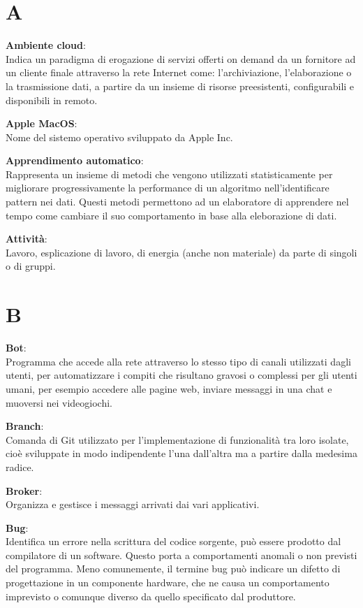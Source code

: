\documentclass[a4paper, oneside, openany, dvipsnames, table]{article}
\begin{document}
\copertina{}


\newpage
\tableofcontents
\newpage


\newpage
\section{A}  
\textbf{Ambiente cloud}:\\	 Indica un paradigma di erogazione di servizi offerti on demand da un fornitore ad un cliente finale attraverso la rete Internet come: l'archiviazione, l'elaborazione o la trasmissione dati, a partire da un insieme di risorse preesistenti, configurabili e disponibili in remoto.

\textbf{Apple MacOS}:\\ Nome del sistemo operativo sviluppato da Apple Inc.

\textbf{Apprendimento automatico}:\\	Rappresenta un insieme di metodi che vengono utilizzati statisticamente per migliorare progressivamente la performance di un algoritmo nell'identificare pattern nei dati. Questi metodi  permettono ad un elaboratore di apprendere nel tempo come cambiare il suo comportamento in base alla eleborazione di dati.

\textbf{Attività}:\\ Lavoro, esplicazione di lavoro, di energia (anche non materiale) da parte di singoli o di gruppi.


\newpage
\section{B}
\textbf{Bot}:\\	Programma che accede alla rete attraverso lo stesso tipo di canali utilizzati dagli utenti, per automatizzare i compiti che risultano gravosi o complessi per gli utenti umani, per esempio accedere alle pagine web, inviare messaggi in una chat e  muoversi nei videogiochi. 

\textbf{Branch}:\\ Comanda di Git utilizzato per l’implementazione di funzionalità tra loro isolate, cioè sviluppate in modo indipendente l’una dall’altra ma a partire dalla medesima radice.

\textbf{Broker}:\\ Organizza e gestisce i messaggi arrivati dai vari applicativi.

\textbf{Bug}:\\	Identifica un errore nella scrittura del codice sorgente, può essere prodotto dal compilatore di un software. Questo porta a comportamenti anomali o non previsti del programma. Meno comunemente, il termine bug può indicare un difetto di progettazione in un componente hardware, che ne causa un comportamento imprevisto o comunque diverso da quello specificato dal produttore.
\end{document}
